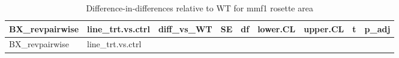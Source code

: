 \documentclass[
  10pt,
]{article}
\begin{document}
\begin{longtable}[]{@{}
  >{\raggedright\arraybackslash}p{}
  >{\raggedright\arraybackslash}p{}
  >{\raggedleft\arraybackslash}p{}
  >{\raggedleft\arraybackslash}p{}
  >{\raggedleft\arraybackslash}p{}
  >{\raggedleft\arraybackslash}p{}
  >{\raggedleft\arraybackslash}p{}
  >{\raggedleft\arraybackslash}p{}
  >{\raggedleft\arraybackslash}p{}@{}}
\caption{Difference-in-differences relative to WT for mmf1 rosette
area}\tabularnewline
\toprule\noalign{}
\begin{minipage}[b]{\linewidth}\raggedright
BX\_revpairwise
\end{minipage} & \begin{minipage}[b]{\linewidth}\raggedright
line\_trt.vs.ctrl
\end{minipage} & \begin{minipage}[b]{\linewidth}\raggedleft
diff\_vs\_WT
\end{minipage} & \begin{minipage}[b]{\linewidth}\raggedleft
SE
\end{minipage} & \begin{minipage}[b]{\linewidth}\raggedleft
df
\end{minipage} & \begin{minipage}[b]{\linewidth}\raggedleft
lower.CL
\end{minipage} & \begin{minipage}[b]{\linewidth}\raggedleft
upper.CL
\end{minipage} & \begin{minipage}[b]{\linewidth}\raggedleft
t
\end{minipage} & \begin{minipage}[b]{\linewidth}\raggedleft
p\_adj
\end{minipage} \\
\midrule\noalign{}
\endfirsthead
\toprule\noalign{}
\begin{minipage}[b]{\linewidth}\raggedright
BX\_revpairwise
\end{minipage} & \begin{minipage}[b]{\linewidth}\raggedright
line\_trt.vs.ctrl
\end{minipage} & \begin{minipage}[b]{\linewidth}\raggedleft

\end{minipage}
\end{longtable}
\end{document}
